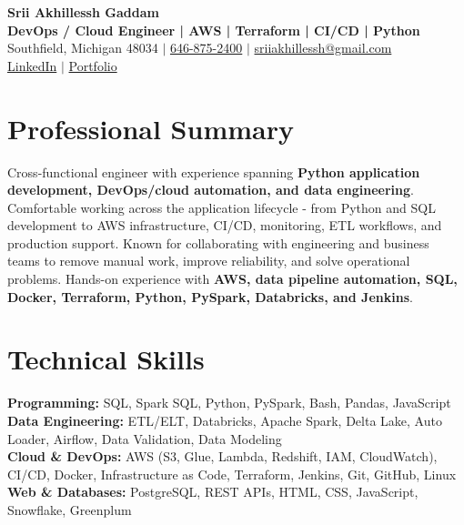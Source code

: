 \documentclass[letterpaper,10pt]{article}
\begin{document}
\fontsize{9.35pt}{10.45pt}\selectfont

\begin{center}
    {\LARGE \textbf{Srii Akhillessh Gaddam}} \\[-1pt]
    \textbf{DevOps / Cloud Engineer | AWS | Terraform | CI/CD | Python} \\[2pt]
    Southfield, Michigan 48034 $|$
    \href{tel:6468752400}{646-875-2400} $|$
    \href{mailto:sriiakhillessh@gmail.com}{sriiakhillessh@gmail.com} \\[1pt]
    \href{https://www.linkedin.com/in/srii-akhiilessh-gaddam-b48668191/}{LinkedIn} $|$
    \href{https://sriiakhillesshg.github.io/portfolio/}{Portfolio}
\end{center}
\vspace{-8pt}

\section{Professional Summary}
\small{Cross-functional engineer with experience spanning \textbf{Python application development, DevOps/cloud automation, and data engineering}. Comfortable working across the application lifecycle - from Python and SQL development to AWS infrastructure, CI/CD, monitoring, ETL workflows, and production support. Known for collaborating with engineering and business teams to remove manual work, improve reliability, and solve operational problems. Hands-on experience with \textbf{AWS, data pipeline automation, SQL, Docker, Terraform, Python, PySpark, Databricks, and Jenkins}.}

\section{Technical Skills}
\small{
\textbf{Programming:} SQL, Spark SQL, Python, PySpark, Bash, Pandas, JavaScript \\
\textbf{Data Engineering:} ETL/ELT, Databricks, Apache Spark, Delta Lake, Auto Loader, Airflow, Data Validation, Data Modeling \\
\textbf{Cloud \& DevOps:} AWS (S3, Glue, Lambda, Redshift, IAM, CloudWatch), CI/CD, Docker, Infrastructure as Code, Terraform, Jenkins, Git, GitHub, Linux \\
\textbf{Web \& Databases:} PostgreSQL, REST APIs, HTML, CSS, JavaScript, Snowflake, Greenplum
}
\end{document}
